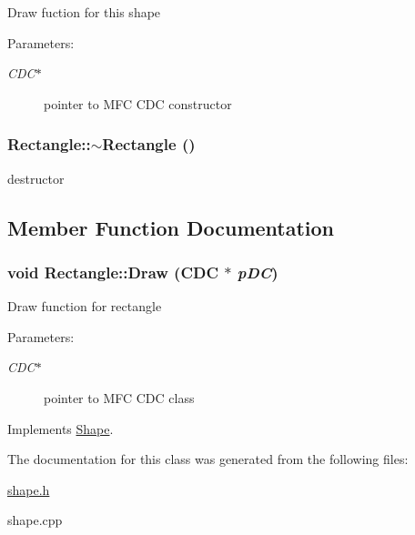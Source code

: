 Draw fuction for this shape \begin{Desc}
\item[Parameters:]
\begin{description}
\item[{\em CDC$\ast$}]pointer to MFC CDC constructor \end{description}
\end{Desc}
\hypertarget{classRectangle_494c076b13aadf26efdce07d23c61ddd}{
\subsubsection[$\sim$Rectangle]{\setlength{\rightskip}{0pt plus 5cm}Rectangle::$\sim$Rectangle ()}}
\label{classRectangle_494c076b13aadf26efdce07d23c61ddd}


destructor 

\subsection{Member Function Documentation}
\hypertarget{classRectangle_22e5e5f9e3c7474d3586e1d7d36bb069}{
\subsubsection[Draw]{\setlength{\rightskip}{0pt plus 5cm}void Rectangle::Draw (CDC $\ast$ {\em pDC})}}
\label{classRectangle_22e5e5f9e3c7474d3586e1d7d36bb069}


Draw function for rectangle \begin{Desc}
\item[Parameters:]
\begin{description}
\item[{\em CDC$\ast$}]pointer to MFC CDC class \end{description}
\end{Desc}


Implements \hyperlink{classShape_ef21058ba7bb2497796f678b0607cf5d}{Shape}.

The documentation for this class was generated from the following files:\begin{CompactItemize}
\item 
\hyperlink{shape_8h}{shape.h}\item 
shape.cpp\end{CompactItemize}
